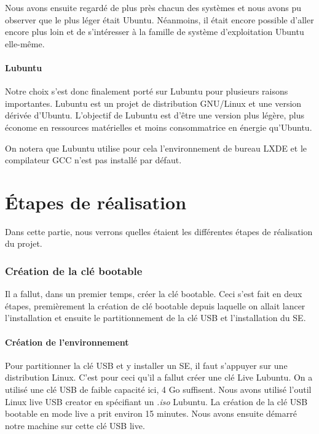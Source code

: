\documentclass[final]{polytech/polytech}
\begin{document}
Nous avons ensuite regardé de plus près chacun des systèmes et nous avons pu observer que le plus léger était Ubuntu. Néanmoins, il était encore possible d’aller encore plus loin et de s’intéresser à la famille de système d’exploitation Ubuntu elle-même.

\subsection{Lubuntu}
Notre choix s’est donc finalement porté sur Lubuntu pour plusieurs raisons importantes. Lubuntu est un projet de distribution GNU/Linux et une version dérivée d’Ubuntu. L’objectif de Lubuntu est d’être une version plus légère, plus économe en ressources matérielles et moins consommatrice en énergie qu’Ubuntu.

On notera que Lubuntu utilise pour cela l’environnement de bureau LXDE et le compilateur GCC  n’est pas installé par défaut.

\part{Étapes de réalisation} %
Dans cette partie, nous verrons quelles étaient les différentes étapes de réalisation du projet.

\section{Création de la clé bootable}
Il a fallut, dans un premier temps, créer la clé bootable. Ceci s'est fait en deux étapes, premièrement la création de clé bootable depuis laquelle on allait lancer l'installation et ensuite le partitionnement de la clé USB et l'installation du SE.

\subsection{Création de l'environnement}
Pour partitionner la clé USB et y installer un SE, il faut s'appuyer sur une distribution Linux. C'est pour ceci qu'il a fallut créer une clé Live Lubuntu. On a utilisé une clé USB de faible capacité ici, 4 Go suffisent. Nous avons utilisé l'outil Linux live USB creator en spécifiant un \textit{.iso} Lubuntu. La création de la clé USB bootable en mode live a prit environ 15 minutes. Nous avons ensuite démarré notre machine sur cette clé USB live.
\end{document}
